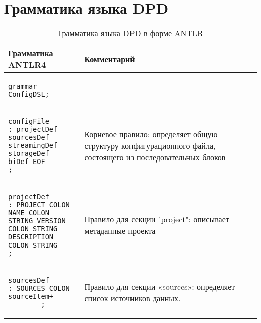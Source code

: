 \chapter{Грамматика языка DPD}\label{grammatic-dpd}							%
\begin{longtable}{|p{3in}|p{3in}|}
    \caption{Грамматика языка DPD в форме ANTLR}\\
    \hline
    Грамматика ANTLR4            & Комментарий                                                                                                                                                           \\ \hline
    \begin{minipage}{2.6in}
        \begin{verbatim}
grammar ConfigDSL;
        \end{verbatim}
    \end{minipage}      &                                                                                                                                                                               \\ \hline
    \begin{minipage}{3in}
        \begin{verbatim}
configFile
: projectDef
sourcesDef
streamingDef
storageDef
biDef EOF
;
\end{verbatim}
    \end{minipage}        &
    \begin{minipage}{3in}Корневое правило: определяет общую структуру конфигурационного файла, состоящего из последовательных блоков\end{minipage}                                                       \\ \hline
    \begin{minipage}{2.6in}
        \begin{verbatim}
projectDef
: PROJECT COLON NAME COLON 
STRING VERSION COLON STRING 
DESCRIPTION COLON STRING
;
    \end{verbatim}
    \end{minipage} &
    \begin{minipage}{3in}Правило для секции "project": описывает метаданные проекта\end{minipage}                                                                                                        \\ \hline
    \begin{minipage}{3in}
        \begin{verbatim}
sourcesDef
: SOURCES COLON 
sourceItem+
        ;
    \end{verbatim}
    \end{minipage}
                                 &
    \begin{minipage}{2.6in}
        Правило для секции «sources»: определяет список источников данных.
    \end{minipage}
    \\ \hline


\end{longtable}
